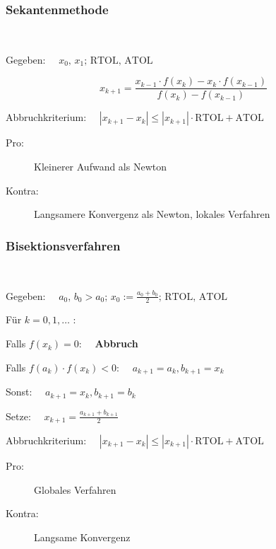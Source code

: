 		\subsubsection{Sekantenmethode}
			\begin{algo} ~

				Gegeben: $\quad x_0,\, x_1 ;\, \mathrm{RTOL},\, \mathrm{ATOL}$

				\[
					x_{k+1} = \frac{x_{k-1}\cdot f(x_k) - x_k \cdot f(x_{k-1})}{f(x_k) - f(x_{k-1})}
				\]

				Abbruchkriterium: $\quad|x_{k+1} - x_k| \leq |x_{k+1}|\cdot \mathrm{RTOL} + \mathrm{ATOL}$
				\begin{description}
					\item[Pro:] Kleinerer Aufwand als Newton
					\item[Kontra:] Langsamere Konvergenz als Newton, lokales Verfahren
				\end{description}
			\end{algo}

		\subsubsection{Bisektionsverfahren}
			\begin{algo} ~

				Gegeben: $\quad a_0,\, b_0 > a_0;\, x_0 := \frac{a_0 + b_0}{2};\, \mathrm{RTOL},\, \mathrm{ATOL}$

				Für $k=0,1,\dots$ :
				\begin{tightenumerate}
					\item Falls $f(x_k) = 0$: $\quad$\textbf{Abbruch}
					\item Falls $f(a_k)\cdot f(x_k) < 0$:
						$\quad
							a_{k+1}= a_k , b_{k+1} = x_k
						$
					\item Sonst:
						$\quad
							a_{k+1} = x_k, b_{k+1} = b_k
						$
					\item Setze:
						$\quad\displaystyle
							x_{k+1} = \frac{a_{k+1} + b_{k+1}}{2}
						$
				\end{tightenumerate}
				Abbruchkriterium: $\quad|x_{k+1} - x_k| \leq |x_{k+1}|\cdot \mathrm{RTOL} + \mathrm{ATOL}$
				\begin{description}
					\item[Pro:] Globales Verfahren
					\item[Kontra:] Langsame Konvergenz
				\end{description}
			\end{algo}

